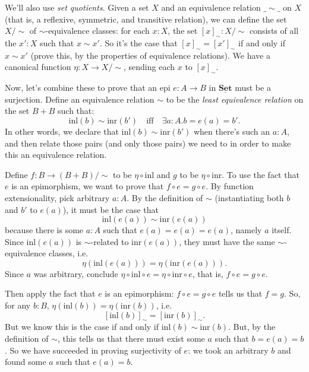 \documentclass{article}
\newcommand{\cat}[1]{\underline{\mathbf{#1}}}
\newcommand{\inl}{\mathrm{inl}}
\newcommand{\inr}{\mathrm{inr}}
\begin{document}
\begin{Answer}
\begin{enumerate}
    We'll also use \emph{set quotients}. Given a set $X$ and an equivalence relation $\_\sim\_$ on $X$ (that is, a reflexive, symmetric, and transitive relation), we can define the set $X/\sim$ of $\sim$-equivalence classes: for each $x\colon X$, the set $[x]_\sim \colon X/\sim$ consists of all the $x'\colon X$ such that $x\sim x'$. So it's the case that $[x]_\sim = [x']_\sim$ if and only if $x\sim x'$ (prove this, by the properties of equivalence relations). We have a canonical function $\eta\colon X\to X/\sim$, sending each $x$ to $[x]_\sim$.

    Now, let's combine these to prove that an epi $e:A\to B$ in $\cat{Set}$ must be a surjection. Define an equivalence relation $\sim$ to be the \emph{least equivalence relation} on the set $B+B$ such that:
    \[ \inl(b) \sim \inr(b') \quad\text{iff}\quad \exists a\colon A. b=e(a)=b'. \]
    In other words, we declare that $\inl(b)\sim\inr(b')$ when there's such an $a\colon A$, and then relate those pairs (and only those pairs) we need to in order to make this an equivalence relation.
    
    Define $f:B\to (B+B)/\sim$ to be $\eta\circ\inl$ and $g$ to be $\eta\circ\inr$. To use the fact that $e$ is an epimorphism, we want to prove that $f\circ e = g\circ e$. By function extensionality, pick arbitrary $a\colon A$. By the definition of $\sim$ (instantiating both $b$ and $b'$ to $e(a)$), it must be the case that
    \[ \inl(e(a)) \sim \inr(e(a)) \]
    because there is some $a\colon A$ such that $e(a)=e(a)=e(a)$, namely $a$ itself. Since $\inl(e(a))$ is $\sim$-related to $\inr(e(a))$, they must have the same $\sim$-equivalence classes, i.e.
    \[ \eta(\inl(e(a))) = \eta(\inr(e(a))). \]
    Since $a$ was arbitrary, conclude $\eta\circ\inl\circ e = \eta\circ\inr\circ e$, that is, $f\circ e = g\circ e$. 
    
    Then apply the fact that $e$ is an epimorphism: $f\circ e = g\circ e$ tells us that $f=g$. So, for any $b\colon B$, $\eta(\inl(b))=\eta(\inr(b))$, i.e.
    \[ [\inl(b)]_\sim = [\inr(b)]_\sim. \]
    But we know this is the case if and only if $\inl(b)\sim\inr(b)$. But, by the definition of $\sim$, this tells us that there must exist some $a$ such that $b=e(a)=b$. So we have succeeded in proving surjectivity of $e$: we took an arbitrary $b$ and found some $a$ such that $e(a)=b$.
  \end{enumerate}
\end{Answer}
\end{document}
